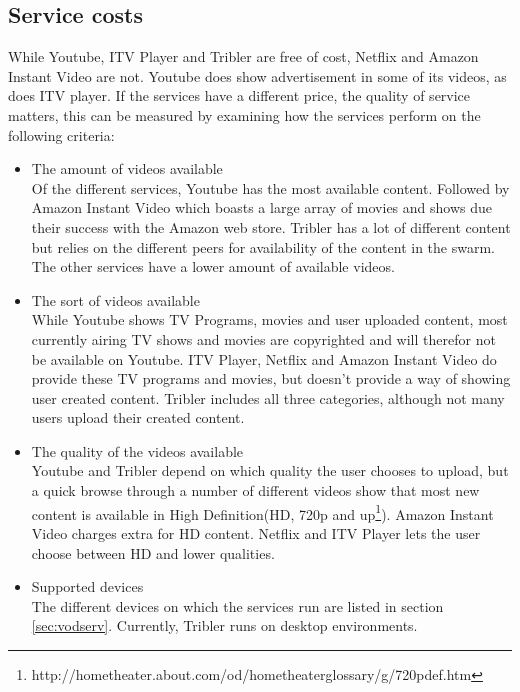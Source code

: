 \subsection{Service costs}
While Youtube, ITV Player and Tribler are free of cost, Netflix and Amazon Instant Video are not. Youtube does show advertisement in some of its videos, as does ITV player. If the services have a different price, the quality of service matters, this can be measured by examining how the services perform on the following criteria:
\begin{itemize}
\item The amount of videos available\\
Of the different services, Youtube has the most available content. Followed by Amazon Instant Video which boasts a large array of movies and shows due their success with the Amazon web store. Tribler has a lot of different content but relies on the different peers for availability of the content in the swarm. The other services have a lower amount of available videos.
\item The sort of videos available\\
While Youtube shows TV Programs, movies and user uploaded content, most currently airing TV shows and movies are copyrighted and will therefor not be available on Youtube. ITV Player, Netflix and Amazon Instant Video do provide these TV programs and movies, but doesn't provide a way of showing user created content. Tribler includes all three categories, although not many users upload their created content.
\item The quality of the videos available\\
Youtube and Tribler depend on which quality the user chooses to upload, but a quick browse through a number of different videos show that most new content is available in  High Definition(HD, 720p and up\footnote{http://hometheater.about.com/od/hometheaterglossary/g/720pdef.htm}). Amazon Instant Video charges extra for HD content. Netflix and ITV Player lets the user choose between HD and lower qualities.
\item Supported devices\\
The different devices on which the services run are listed in section \ref{sec:vodserv}. Currently, Tribler runs on desktop environments.
\end{itemize}
